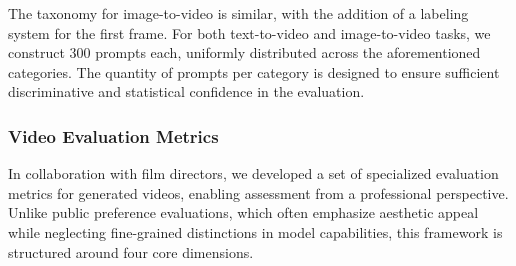 The taxonomy for image-to-video is similar, with the addition of a labeling system for the first frame. For both text-to-video and image-to-video tasks, we construct 300 prompts each, uniformly distributed across the aforementioned categories. The quantity of prompts per category is designed to ensure sufficient discriminative and statistical confidence in the evaluation.

\subsubsection{Video Evaluation Metrics}
In collaboration with film directors, we developed a set of specialized evaluation metrics for generated videos, enabling assessment from a professional perspective. Unlike public preference evaluations, which often emphasize aesthetic appeal while neglecting fine-grained distinctions in model capabilities, this framework is structured around four core dimensions.

